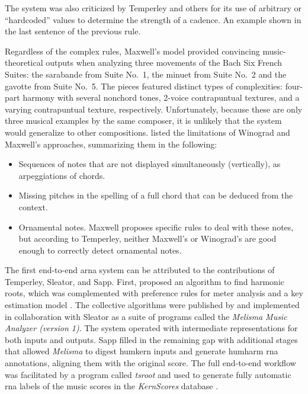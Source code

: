 The system was also criticized by Temperley and others for
its use of arbitrary or ``hardcoded'' values to determine
the strength of a cadence. An example shown in the last
sentence of the previous rule.

Regardless of the complex rules, Maxwell's model provided
convincing music-theoretical outputs when analyzing three
movements of the Bach Six French Suites: the sarabande from
Suite No.~1, the minuet from Suite No.~2 and the gavotte
from Suite No.~5. The pieces featured distinct types of
complexities: four-part harmony with several nonchord tones,
2-voice contrapuntual textures, and a varying contrapuntual
texture, respectively. Unfortunately, because these are only
three musical examples by the same composer, it is unlikely
that the system would generalize to other compositions.
\textcite{temperley1997algorithm} listed the limitations of
Winograd and Maxwell's approaches, summarizing them in the
following:

\begin{itemize}
    \item Sequences of notes that are not displayed
    simultaneously (vertically), as arpeggiations of chords.
    \item Missing pitches in the spelling of a full chord
    that can be deduced from the context.
    \item Ornamental notes. Maxwell proposes specific rules
    to deal with these notes, but according to Temperley,
    neither Maxwell's or Winograd's are good enough to
    correctly detect ornamental notes.
\end{itemize}


The first end-to-end \gls{arna} system can be attributed to
the contributions of Temperley, Sleator, and Sapp. First,
\textcite{temperley1997algorithm} proposed an algorithm to
find harmonic roots, which was complemented with preference
rules for meter analysis \parencite{temperley1999modeling}
and a key estimation model \parencite{temperley1999whats}.
The collective algorithms were published by
\textcite{temperley2004cognition} and implemented in
collaboration with Sleator as a suite of programs called the
\emph{Melisma Music Analyzer (version
1)}.
The system operated with intermediate representations for
both inputs and outputs. Sapp filled in the remaining gap
with additional stages that allowed \emph{Melisma} to digest
\gls{humkern} inputs and generate \gls{humharm} \gls{rna}
annotations, aligning them with the original score. The full
end-to-end workflow was facilitated by a program called
\emph{tsroot} \parencite{sapp2009tsroot} and used to
generate fully automatic \gls{rna} labels of the music
scores in the \emph{KernScores} database
\parencite{sapp2005online}.

